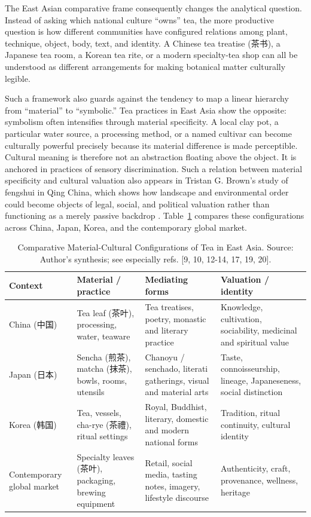 \documentclass[numbers]{IntechOpen-Book}
\newcommand{\zh}[1]{{\CJKfontspec{Noto Serif CJK SC}\upshape #1}}
\begin{document}
The East Asian comparative frame consequently changes the analytical question. Instead of asking which national culture ``owns'' tea, the more productive question is how different communities have configured relations among plant, technique, object, body, text, and identity. A Chinese tea treatise (\zh{茶书}), a Japanese tea room, a Korean tea rite, or a modern specialty-tea shop can all be understood as different arrangements for making botanical matter culturally legible.

Such a framework also guards against the tendency to map a linear hierarchy from ``material'' to ``symbolic.'' Tea practices in East Asia show the opposite: symbolism often intensifies through material specificity. A local clay pot, a particular water source, a processing method, or a named cultivar can become culturally powerful precisely because its material difference is made perceptible. Cultural meaning is therefore not an abstraction floating above the object. It is anchored in practices of sensory discrimination. Such a relation between material specificity and cultural valuation also appears in Tristan G. Brown's study of fengshui in Qing China, which shows how landscape and environmental order could become objects of legal, social, and political valuation rather than functioning as a merely passive backdrop \cite{brown}. Table~\ref{tab:comparative-east-asia} compares these configurations across China, Japan, Korea, and the contemporary global market.

\begin{table}[t]
\centering
\small
\renewcommand{\arraystretch}{1.12}
\begin{tabularx}{\textwidth}{>{\raggedright\arraybackslash}p{19mm} >{\raggedright\arraybackslash}X >{\raggedright\arraybackslash}X >{\raggedright\arraybackslash}X}
\toprule
\textbf{Context} & \textbf{Material / practice} & \textbf{Mediating forms} & \textbf{Valuation / identity}\\
\midrule
China (\zh{中国}) & Tea leaf (\zh{茶叶}), processing, water, teaware & Tea treatises, poetry, monastic and literary practice & Knowledge, cultivation, sociability, medicinal and spiritual value\\
Japan (\zh{日本}) & Sencha (\zh{煎茶}), matcha (\zh{抹茶}), bowls, rooms, utensils & Chanoyu / senchado, literati gatherings, visual and material arts & Taste, connoisseurship, lineage, Japaneseness, social distinction\\
Korea (\zh{韩国}) & Tea, vessels, cha-rye (\zh{茶禮}), ritual settings & Royal, Buddhist, literary, domestic and modern national forms & Tradition, ritual continuity, cultural identity\\
Contemporary global market & Specialty leaves (\zh{茶叶}), packaging, brewing equipment & Retail, social media, tasting notes, imagery, lifestyle discourse & Authenticity, craft, provenance, wellness, heritage\\
\bottomrule
\end{tabularx}
\caption{Comparative Material-Cultural Configurations of Tea in East Asia. Source: Author's synthesis; see especially refs. [9, 10, 12-14, 17, 19, 20].}
\label{tab:comparative-east-asia}
\end{table}
\end{document}
